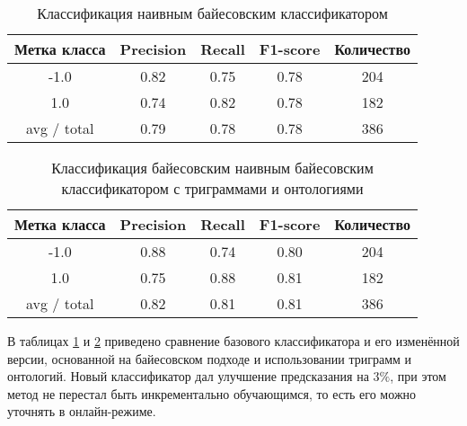 \begin{table}[h]
    \centering
    \begin{tabular}{|c|c|c|c|c|}
      \hline
      \textbf{Метка класса} & \textbf{Precision} & \textbf{Recall} & \textbf{F1-score} &
      \textbf{Количество} \\ \hline
      -1.0&0.82&0.75&0.78&204\\ \hline
      1.0&0.74&0.82&0.78&182\\ \hline \hline
      avg / total&0.79&0.78&0.78&386\\
      \hline
    \end{tabular}
    \caption{Классификация наивным байесовским классификатором}\label{tab:nb1}
\end{table}
\begin{table}[h!]
    \centering
    \begin{tabular}{|c|c|c|c|c|}
      \hline
      \textbf{Метка класса} & \textbf{Precision} & \textbf{Recall} & \textbf{F1-score} &
      \textbf{Количество} \\ \hline
      -1.0&0.88&0.74&0.80&204\\ \hline
      1.0&0.75&0.88&0.81&182\\ \hline \hline
      avg / total&0.82&0.81&0.81&386\\
      \hline
    \end{tabular}
    \caption{Классификация байесовским наивным байесовским классификатором с триграммами и онтологиями}\label{tab:bnb}
\end{table}

В таблицах \ref{tab:nb1} и \ref{tab:bnb} приведено сравнение базового классификатора и его
изменённой версии, основанной на байесовском подходе и использовании триграмм и онтологий. Новый
классификатор дал улучшение предсказания на $3\%$, при этом метод не перестал быть инкрементально
обучающимся, то есть его можно уточнять в онлайн-режиме.
